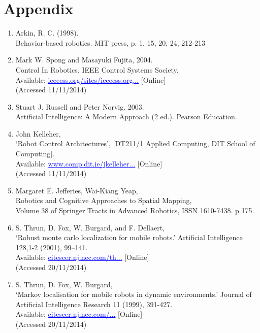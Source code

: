 \documentclass{article}
\begin{document}
\section{Appendix}

\begin{enumerate}

\item Arkin, R. C. (1998).
\\Behavior-based robotics. MIT press, p. 1, 15, 20, 24, 212-213

\item Mark W. Spong and Masayuki Fujita, 2004.
\\Control In Robotics. IEEE Control Systems Society. \\Available: \href{ieeecss.org/sites/ieeecss.org/files/documents/IoCT-Part1-04Robotics.pdf}{\textcolor{blue}{\uline{ieeecss.org/sites/ieeecss.org...}}} [Online]
\\(Accessed 11/11/2014)

\item Stuart J. Russell and Peter Norvig. 2003.
\\Artificial Intelligence: A Modern Approach (2 ed.). Pearson Education.

\item John Kelleher,
\\‘Robot Control Architectures’,  [DT211/1 Applied Computing, DIT School of Computing].
\\Available: \href{www.comp.dit.ie/jkelleher/appliedcomputing/week8/RCA.pdf}{\textcolor{blue}{\uline{www.comp.dit.ie/jkelleher...}}} [Online]
\\(Accessed 11/11/2014)

\item Margaret E. Jefferies, Wai-Kiang Yeap,
\\Robotics and Cognitive Approaches to Spatial Mapping,
\\Volume 38 of Springer Tracts in Advanced Robotics, ISSN 1610-7438. p 175.

\item S. Thrun, D. Fox, W. Burgard, and F. Dellaert,
\\‘Robust monte carlo localization for mobile robots.’ Artificial Intelligence 128,1-2 (2001), 99–141.
\\Available: \href{citeseer.nj.nec.com/thrun01robust.html}{\textcolor{blue}{\uline{citeseer.nj.nec.com/th...}}} [Online]
\\(Accessed 20/11/2014)

\item S. Thrun, D. Fox, W. Burgard,
\\‘Markov localisation for mobile robots in dynamic environments.’ Journal of Artificial Intelligence Research 11 (1999), 391-427.
\\Available: \href{citeseer.nj.nec.com/fox99markov.html}{\textcolor{blue}{\uline{citeseer.nj.nec.com/...}}} [Online]
\\(Accessed 20/11/2014)


\end{enumerate}
\end{document}
